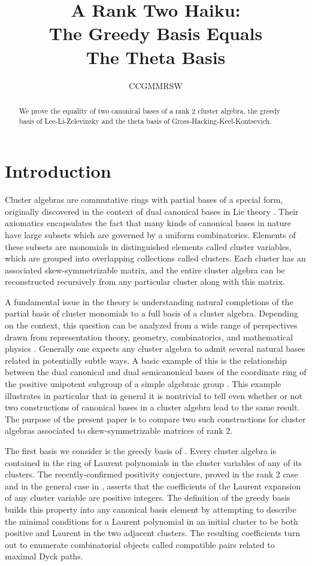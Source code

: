 \documentclass[10pt]{amsart}
\title[The Greedy Basis is the Theta Basis]{A Rank Two Haiku:\\ The Greedy Basis Equals \\ The Theta Basis}
\author{CCGMMRSW}
\theoremstyle{remark}
\numberwithin{equation}{section}
\begin{document}
\begin{abstract}
We prove the equality of two canonical bases of a rank 2 cluster algebra, the greedy basis of Lee-Li-Zelevinsky and the theta basis of Gross-Hacking-Keel-Kontsevich.
\end{abstract}

\maketitle

\section{Introduction}

Cluster algebras are commutative rings with partial bases of a special form, originally discovered in the context of dual canonical bases in Lie theory \cite{FZ}.  Their axiomatics encapsulates the fact that many kinds of canonical bases in nature have large subsets which are governed by a uniform combinatorics.  Elements of these subsets are monomials in distinguished elements called cluster variables, which are grouped into overlapping collections called clusters.  Each cluster has an associated skew-symmetrizable matrix, and the entire cluster algebra can be reconstructed recursively from any particular cluster along with this matrix.

A fundamental issue in the theory is understanding natural completions of the partial basis of cluster monomials to a full basis of a cluster algebra.  Depending on the context, this question can be analyzed from a wide range of perspectives drawn from representation theory, geometry, combinatorics, and mathematical physics \cite{Dup,KQ,FG,MSW,BZ,Rup,GMN}.  Generally one expects any cluster algebra to admit several natural bases related in potentially subtle ways.  A basic example of this is the relationship between the dual canonical and dual semicanonical bases of the coordinate ring of the positive unipotent subgroup of a simple algebraic group \cite{GLS}.  This example illustrates in particular that in general it is nontrivial to tell even whether or not two constructions of canonical bases in a cluster algebra lead to the same result.  The purpose of the present paper is to compare two such constructions for cluster algebras associated to skew-symmetrizable matrices of rank 2.  

The first basis we consider is the greedy basis of \cite{LLZ}.  Every cluster algebra is contained in the ring of Laurent polynomials in the cluster variables of any of its clusters.  The recently-confirmed positivity conjecture, proved in the rank 2 case \cite{LS,Rup2} and in the general case in \cite{LS2,GHKK}, asserts that the coefficients of the Laurent expansion of any cluster variable are positive integers.  The definition of the greedy basis builds this property into any canonical basis element by attempting to describe the minimal conditions for a Laurent polynomial in an initial cluster to be both positive and Laurent in the two adjacent clusters.  The resulting coefficients turn out to enumerate combinatorial objects called compatible pairs related to maximal Dyck paths.  
\end{document}

